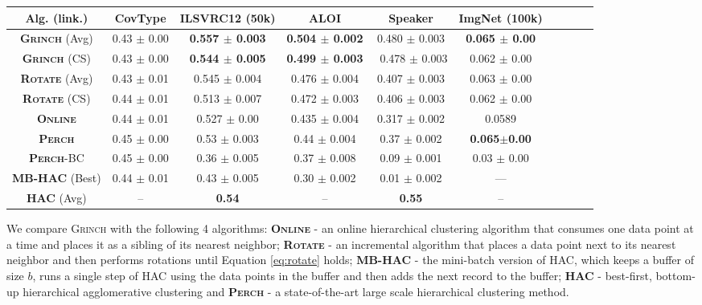\documentclass{article} \usepackage[utf8]{inputenc} \usepackage[T1]{fontenc}    \usepackage{hyperref}       \usepackage{url}            \usepackage{booktabs}       \usepackage{amsfonts}       \usepackage{nicefrac}       \usepackage{microtype}      \usepackage{geometry}
\newcommand{\perch}{\textsc{Perch}\xspace}
\newcommand{\alg}{\textsc{Grinch}\xspace}
\newcommand{\algrotate}{\textsc{Rotate}\xspace}
\newcommand{\records}{data points\xspace}
\newcommand{\record}{data point\xspace}
\newcommand{\hac}{\textsc{HAC}\xspace}
\newcommand{\greedy}{\textsc{Online}\xspace}
\newcommand{\mbhac}{\textsc{MB-HAC}\xspace}
\begin{document}
\begin{table*}[t]
  \centering
  \scriptsize
	\begin{tabular}{c c c c c c c c c c}
		\hline
		\textbf{Alg. (link.)} & \textbf{CovType} & \textbf{ILSVRC12 (50k)}  & \textbf{ALOI} & \textbf{Speaker}   & \textbf{ImgNet (100k)}\\
		\hline
		\textbf{\alg} (Avg)  & 0.43 $\pm$ 0.00 & \bf 0.557 $\pm$ 0.003 & \bf 0.504 $\pm$ 0.002 &   0.480 $\pm$ 0.003 & \bf 0.065 $\pm$ 0.00\\
		\textbf{\alg} (CS)   & 0.43	$\pm$ 0.00 & \bf 0.544 $\pm$ 0.005 & \bf 0.499 $\pm$ 0.003 & \ 0.478 $\pm$ 0.003 &   0.062 $\pm$ 0.00\\
		\textbf{\algrotate} (Avg) & 0.43 $\pm$ 0.01 & 0.545 $\pm$ 0.004  &0.476 $\pm$ 0.004 & 0.407 $\pm$ 0.003 & 0.063 $\pm$ 0.00\\
		\textbf{\algrotate} (CS)  & 0.44 $\pm$ 0.01 & 0.513 $\pm$ 0.007 & 0.472 $\pm$ 0.003 & 0.406 $\pm$ 0.003 & 0.062 $\pm$ 0.00\\
		\textbf{\greedy}          & 0.44 $\pm$ 0.01 & 0.527 $\pm$ 0.00 & 0.435 $\pm$ 0.004 &  0.317 $\pm$ 0.002 & 0.0589\\
		\textbf{\perch} \cite{kobren2017hierarchical} & 0.45 $\pm$ 0.00 & 0.53 $\pm$ 0.003 &  0.44 $\pm$ 0.004 &   0.37 $\pm$ 0.002 & \bf 0.065$\pm$0.00\\
		\textbf{\perch}-BC \cite{kobren2017hierarchical}& 0.45 $\pm$ 0.00 & 0.36 $\pm$ 0.005 & 0.37 $\pm$ 0.008 & 0.09 $\pm$ 0.001 & 0.03 $\pm$ 0.00\\
		\textbf{\mbhac} (Best) \cite{kobren2017hierarchical} & 0.44 $\pm$ 0.01 & 0.43 $\pm$ 0.005 & 0.30 $\pm$ 0.002 & 0.01 $\pm$ 0.002 &  --- &\\
		\textbf{HAC} (Avg) \cite{kobren2017hierarchical} & -- & \bf 0.54 &  -- & \bf 0.55 &  --  \\
          \hline
	\end{tabular}
	\caption{Dendrogram Purity results for \alg and baseline
          methods. We compare two linkage functions: approximate
          average linkage (Avg) and cosine similarity linkage
          (CS). }
	\label{tab:xclusterdp}
\end{table*}
 We compare \alg with the following 4 algorithms: \textbf{\greedy} - an
online hierarchical clustering algorithm that consumes one \record at
a time and places it as a sibling of its nearest neighbor;
\textbf{\algrotate} - an incremental algorithm that places a \record
next to its nearest neighbor and then performs rotations until
Equation \ref{eq:rotate} holds;
\textbf{\mbhac} - the mini-batch version of
\hac, which keeps a buffer of size $b$, runs a single step of \hac using
the \records in the buffer and then adds the next record to the buffer;
 \textbf{\hac} - best-first, bottom-up hierarchical agglomerative
clustering and \textbf{\perch} - a state-of-the-art large scale hierarchical clustering method.
\end{document}
